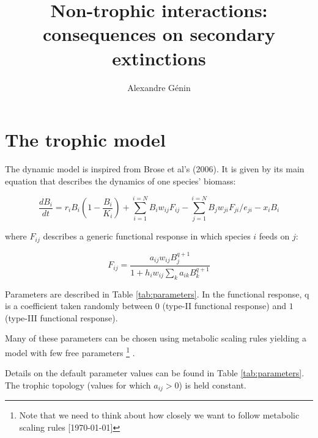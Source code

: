 \documentclass[a4paper,11pt]{article}
\title{Non-trophic interactions: consequences on secondary extinctions}
\author{Alexandre Génin}
\begin{document}
  
  \maketitle 
  
  \section{The trophic model}
      
      
      The dynamic model is inspired from Brose et al's (2006). It is given by 
its main equation that describes the dynamics of one species' biomass: 
    
    \begin{equation}
      \label{eq:popdyn}
      \frac{dB_i}{dt} =   r_iB_i(1 - \frac{B_i}{K_i}) 
                        + \sum_{i=1}^{i=N} B_i w_{ij} F_{ij} 
                        - \sum_{j=1}^{i=N} B_j w_{ji} F_{ji} / e_{ji} 
                        - x_i B_i 
    \end{equation}
    
    where $F_{ij}$ describes a generic functional response in which species $i$ 
feeds on $j$: 
    
    \begin{equation}
      F_{ij} = \frac{a_{ij} w_{ij} B_{j}^{q+1} }{ 
        1 + h_{i} w_{ij} \sum_{k} a_{ik} B_{k}^{q+1} }
    \end{equation}
    
    Parameters are described in Table \ref{tab:parameters}. In the functional 
response, q is a coefficient taken randomly between $0$ (type-II functional 
response) and $1$ (type-III functional response). 
    
    Many of these parameters can be chosen using metabolic scaling rules 
yielding a model with few free parameters \footnote{Note that we need to think 
about how closely we want to follow metabolic scaling rules [\today]}       .
    
    Details on the default parameter values can be found in Table 
\ref{tab:parameters}. The trophic topology (values for which $a_{ij}>0$) is held 
constant.
    
\end{document}
